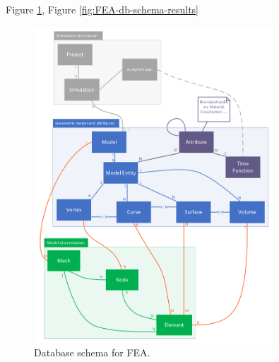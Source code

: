


Figure \ref{fig:FEA-db-schema}, Figure \ref{fig:FEA-db-schema-results}


\begin{figure}[H]
    \centering
    \includegraphics[width=0.8\textwidth]{figures/FEA-database-schema}
    \decoRule
    \caption{Database schema for FEA.}
    \label{fig:FEA-db-schema}
\end{figure}

